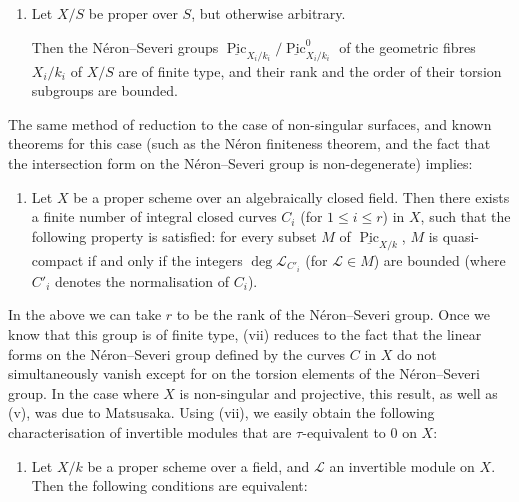 \begin{remark}{}
    
 \begin{enumerate}
      
 \item[vi.]
        Let \(X/S\) be proper over \(S\), but otherwise arbitrary.
        
        Then the Néron–Severi groups \(\underline {\operatorname {Pic}}_{X_i/k_i}/\underline {\operatorname {Pic}}_{X_i/k_i}^0\) of the geometric fibres \(X_i/k_i\) of \(X/S\) are of finite type, and their rank and the order of their torsion subgroups are bounded.
      

    \end{enumerate}\par{}The same method of reduction to the case of non-singular surfaces, and known theorems for this case (such as the Néron finiteness theorem, and the fact that the intersection form on the Néron–Severi group is non-degenerate) implies:

    
 \begin{enumerate}
      
 \item[vii.]
        Let \(X\) be a proper scheme over an algebraically closed field.
        Then there exists a finite number of integral closed curves \(C_i\) (for \(1\leqslant  i\leqslant  r\)) in \(X\), such that the following property is satisfied:
        for every subset \(M\) of \(\underline {\operatorname {Pic}}_{X/k}\), \(M\) is quasi-compact if and only if the integers \(\deg \mathscr {L}_{C'_i}\) (for \(\mathscr {L}\in  M\)) are bounded (where \(C'_i\) denotes the normalisation of \(C_i\)).
      

    \end{enumerate}


    In the above we can take \(r\) to be the rank of the Néron–Severi group.
    Once we know that this group is of finite type, (vii) reduces to the fact that the linear forms on the Néron–Severi group defined by the curves \(C\) in \(X\) do not simultaneously vanish except for on the torsion elements of the Néron–Severi group.
    In the case where \(X\) is non-singular and projective, this result, as well as (v), was due to Matsusaka.
    Using (vii), we easily obtain the following characterisation of invertible modules that are \(\tau \)-equivalent to \(0\) on \(X\):

    
 \begin{enumerate}
      
 \item[viii.]
        \par{}Let \(X/k\) be a proper scheme over a field, and \(\mathscr {L}\) an invertible module on \(X\).
          Then the following conditions are equivalent:


\end{enumerate}
\end{remark}
